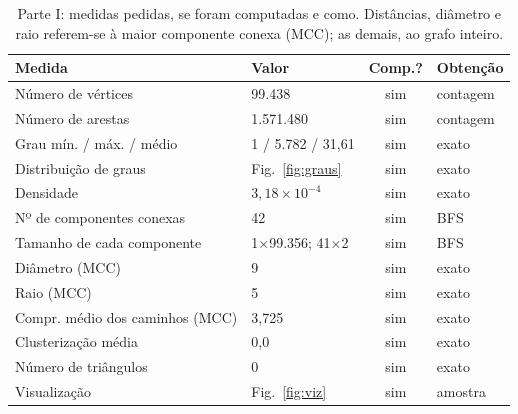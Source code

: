 \begin{table}[t]
\caption{Parte I: medidas pedidas, se foram computadas e como. Distâncias, diâmetro e raio referem-se à maior componente conexa (MCC); as demais, ao grafo inteiro.}
\label{tab:parte1}
\footnotesize
\begin{tabular}{@{}p{3.15cm}lcl@{}}
\toprule
Medida & Valor & Comp.? & Obtenção \\
\midrule
Número de vértices & 99.438 & sim & contagem \\
Número de arestas & 1.571.480 & sim & contagem \\
Grau mín. / máx. / médio & 1 / 5.782 / 31{,}61 & sim & exato \\
Distribuição de graus & Fig.~\ref{fig:graus} & sim & exato \\
Densidade & $3{,}18\times 10^{-4}$ & sim & exato \\
Nº de componentes conexas & 42 & sim & BFS \\
Tamanho de cada componente & 1$\times$99.356; 41$\times$2 & sim & BFS \\
Diâmetro (MCC) & 9 & sim & exato \\
Raio (MCC) & 5 & sim & exato \\
Compr. médio dos caminhos (MCC) & 3{,}725 & sim & exato \\
Clusterização média & 0{,}0 & sim & exato \\
Número de triângulos & 0 & sim & exato \\
Visualização & Fig.~\ref{fig:viz} & sim & amostra \\
\bottomrule
\end{tabular}
\end{table}
